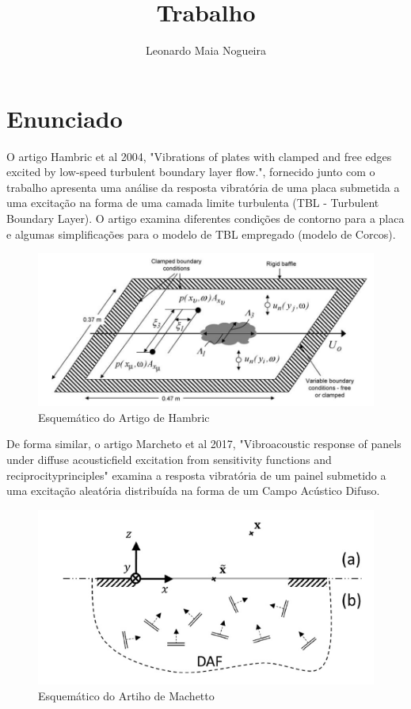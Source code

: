 \documentclass[9pt,a4paper,twoside]{rho-class/rho}
\title{Trabalho}
\author[1]{Leonardo Maia Nogueira}
\begin{document}
	
    \maketitle
    \thispagestyle{firststyle}


\section{Enunciado}
O artigo Hambric et al 2004, "Vibrations of plates with clamped and free edges excited by low-speed
turbulent boundary layer flow.", fornecido junto com o trabalho apresenta uma análise da resposta
vibratória de uma placa submetida a uma excitação na forma de uma camada limite turbulenta (TBL -
Turbulent Boundary Layer). O artigo examina diferentes condições de contorno para a placa e algumas
simplificações para o modelo de TBL empregado (modelo de Corcos).
\begin{figure}[H]
	\centering
	\includegraphics[width=0.9\columnwidth]{figures/schema_TBL.png}
	\caption{Esquemático do Artigo de Hambric}
	\label{fig:schmtbl}
\end{figure}

De forma similar, o artigo Marcheto et al 2017, "Vibroacoustic response of panels under diffuse acousticfield excitation from sensitivity functions and reciprocityprinciples" examina a resposta vibratória de um painel submetido a uma excitação aleatória distribuída na forma de um Campo Acústico Difuso. 
\begin{figure}[H]
	\centering
	\includegraphics[width=0.9\columnwidth]{figures/schema_DAF.png}
	\caption{Esquemático do Artiho de Machetto}
	\label{fig:schmdaf}
\end{figure}
\end{document}
